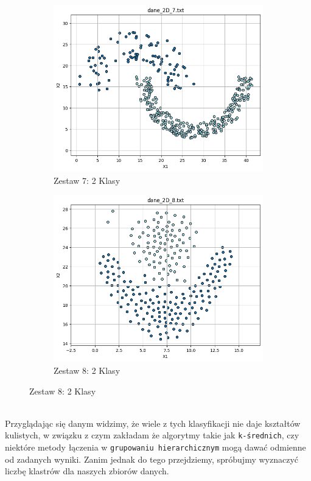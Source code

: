 \documentclass[polish,12pt,a4paper]{extarticle}
\begin{document}
\begin{figure}[h!]
\begin{subfigure}[b]{0.30\textwidth}
        \includegraphics[width=\linewidth]{img/data/dane7.png}
        \captionsetup{labelformat=empty}
        \caption{Zestaw 7: 2 Klasy}
    \end{subfigure}
    \begin{subfigure}[b]{0.30\textwidth}
        \includegraphics[width=\linewidth]{img/data/dane8.png}
        \captionsetup{labelformat=empty}
        \caption{Zestaw 8: 2 Klasy}
    \end{subfigure}
    \label{fig:data_grid}
\end{figure} \smallskip \\
\noindent Przyglądając się danym widzimy, że wiele z tych klasyfikacji nie daje kształtów kulistych, w związku z czym zakładam że algorytmy takie jak \texttt{k-średnich}, czy niektóre metody łączenia w \texttt{grupowaniu hierarchicznym} mogą dawać odmienne od zadanych wyniki. Zanim jednak do tego przejdziemy, spróbujmy wyznaczyć liczbę klastrów dla naszych zbiorów danych.
\end{document}
